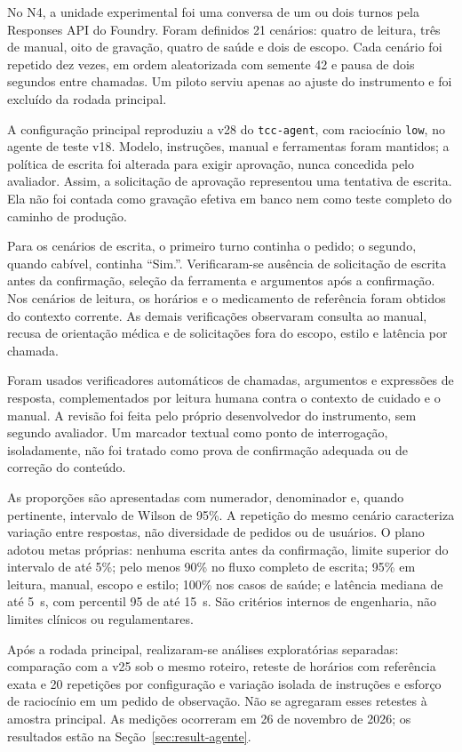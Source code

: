 No N4, a unidade experimental foi uma conversa de um ou dois turnos pela Responses API do Foundry. Foram definidos 21 cenários: quatro de leitura, três de manual, oito de gravação, quatro de saúde e dois de escopo. Cada cenário foi repetido dez vezes, em ordem aleatorizada com semente 42 e pausa de dois segundos entre chamadas. Um piloto serviu apenas ao ajuste do instrumento e foi excluído da rodada principal.

A configuração principal reproduziu a v28 do \texttt{tcc-agent}, com raciocínio \texttt{low}, no agente de teste v18. Modelo, instruções, manual e ferramentas foram mantidos; a política de escrita foi alterada para exigir aprovação, nunca concedida pelo avaliador. Assim, a solicitação de aprovação representou uma tentativa de escrita. Ela não foi contada como gravação efetiva em banco nem como teste completo do caminho de produção.

Para os cenários de escrita, o primeiro turno continha o pedido; o segundo, quando cabível, continha ``Sim.''. Verificaram-se ausência de solicitação de escrita antes da confirmação, seleção da ferramenta e argumentos após a confirmação. Nos cenários de leitura, os horários e o medicamento de referência foram obtidos do contexto corrente. As demais verificações observaram consulta ao manual, recusa de orientação médica e de solicitações fora do escopo, estilo e latência por chamada.

Foram usados verificadores automáticos de chamadas, argumentos e expressões de resposta, complementados por leitura humana contra o contexto de cuidado e o manual. A revisão foi feita pelo próprio desenvolvedor do instrumento, sem segundo avaliador. Um marcador textual como ponto de interrogação, isoladamente, não foi tratado como prova de confirmação adequada ou de correção do conteúdo.

As proporções são apresentadas com numerador, denominador e, quando pertinente, intervalo de Wilson de 95\%. \cite{WILSON1927} A repetição do mesmo cenário caracteriza variação entre respostas, não diversidade de pedidos ou de usuários. O plano adotou metas próprias: nenhuma escrita antes da confirmação, limite superior do intervalo de até 5\%; pelo menos 90\% no fluxo completo de escrita; 95\% em leitura, manual, escopo e estilo; 100\% nos casos de saúde; e latência mediana de até 5~s, com percentil 95 de até 15~s. São critérios internos de engenharia, não limites clínicos ou regulamentares.

Após a rodada principal, realizaram-se análises exploratórias separadas: comparação com a v25 sob o mesmo roteiro, reteste de horários com referência exata e 20 repetições por configuração e variação isolada de instruções e esforço de raciocínio em um pedido de observação. Não se agregaram esses retestes à amostra principal. As medições ocorreram em 26 de novembro de 2026; os resultados estão na Seção~\ref{sec:result-agente}.

